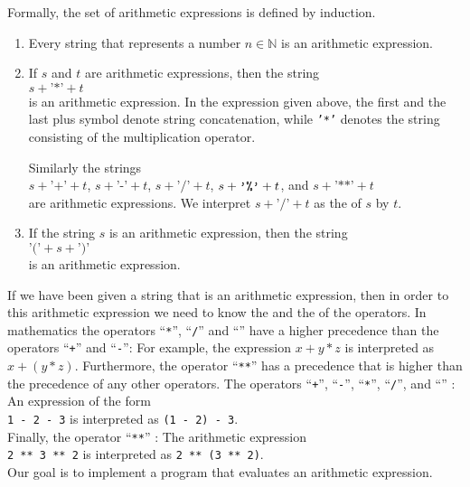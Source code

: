 Formally, the set of arithmetic expressions is defined by induction.
\begin{enumerate}
\item Every string that represents a number $n \in \mathbb{N}$ is an arithmetic expression.
\item If $s$ and $t$ are arithmetic expressions, then the string
      \\[0.2cm]
      \hspace*{1.3cm}
      $s+\texttt{'*'}+t$
      \\[0.2cm]
      is an arithmetic expression.  In the expression given above, the first and the last plus symbol
      denote string concatenation, while \texttt{'*'} denotes the string consisting of the multiplication
      operator. 

      Similarly the strings  
      \\[0.2cm]
      \hspace*{1.3cm}
      $s + \texttt{'+'} + t$, \quad $s + \texttt{'-'} + t$, \quad
      $s + \texttt{'/'} + t$, \quad $s + \texttt{'\symbol{37}'} + t$, \quad and \quad $s +\texttt{'**'} + t$
      \\[0.2cm]
      are arithmetic expressions.  We interpret  $s + \texttt{'/'} + t$ as the  of $s$
      by $t$.
\item If the string $s$ is an arithmetic expression, then the string
      \\[0.2cm]
      \hspace*{1.3cm}
      $\texttt{'('}+ s + \texttt{')'}$ 
      \\[0.2cm]
      is an arithmetic expression.
\end{enumerate}
If we have been given a string that is an arithmetic expression, then in order to  this
arithmetic expression we need to know the  and the
 of the operators.
In mathematics the operators ``\texttt{*}'', ``\texttt{/}'' and ``\texttt{}'' have a
higher precedence than the operators ``\texttt{+}'' and ``\texttt{-}'':  For example, the expression
$x+y*z$ is interpreted as $x + (y * z)$.
 Furthermore, the operator
  ``\texttt{**}'' has a precedence that is higher than the precedence
 of any other operators.  The operators
``\texttt{+}'', ``\texttt{-}'', ``\texttt{*}'', ``\texttt{/}'', and ``\texttt{}''
:  An expression of the form 
\\[0.2cm]
\hspace*{1.3cm} 
\texttt{1 - 2 - 3} \quad is interpreted as \quad \texttt{(1 - 2) - 3}.
 \\[0.2cm]
Finally, the operator ``\texttt{**}'' :
The arithmetic expression \\[0.2cm]
\hspace*{1.3cm} 
\texttt{2 \texttt{**} 3 \texttt{**}  2} \quad is interpreted as \quad 
\texttt{2 \texttt{**} (3 \texttt{**} 2)}. 
\\[0.2cm]
Our goal is to implement a program that evaluates an arithmetic expression.


